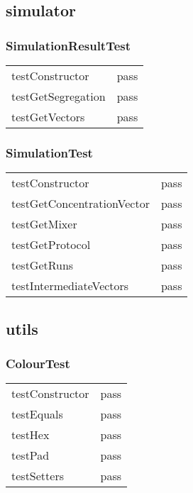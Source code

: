 \subsection{simulator}
\subsubsection*{SimulationResultTest}
\begin{tabular}{l|l}
testConstructor       & pass \\
testGetSegregation & pass \\
testGetVectors         & pass \\
\end{tabular}

\subsubsection*{SimulationTest}
\begin{tabular}{l|l}
testConstructor                    & pass \\
testGetConcentrationVector & pass \\
testGetMixer                         & pass \\
testGetProtocol                     & pass \\
testGetRuns                          & pass \\
testIntermediateVectors       & pass \\
\end{tabular}

\subsection{utils}
\subsubsection*{ColourTest}
\begin{tabular}{l|l}
testConstructor & pass \\
testEquals         & pass \\
testHex             & pass \\
testPad             & pass \\
testSetters        & pass \\
\end{tabular}
